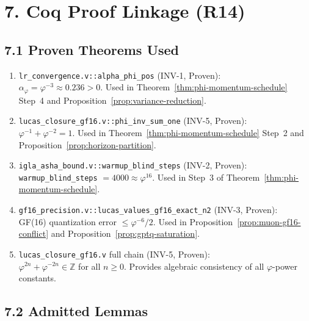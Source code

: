 \section{7. Coq Proof Linkage (R14)}
\label{sec:28-coq}

\subsection{7.1 Proven Theorems Used}

\begin{enumerate}
  \item \texttt{lr\_convergence.v::alpha\_phi\_pos} (INV-1, Proven):\\
        \(\alpha_\varphi = \varphi^{-3} \approx 0.236 > 0\).
        Used in Theorem~\ref{thm:phi-momentum-schedule} Step~4
        and Proposition~\ref{prop:variance-reduction}.

  \item \texttt{lucas\_closure\_gf16.v::phi\_inv\_sum\_one} (INV-5, Proven):\\
        \(\varphi^{-1} + \varphi^{-2} = 1\).
        Used in Theorem~\ref{thm:phi-momentum-schedule} Step~2
        and Proposition~\ref{prop:horizon-partition}.

  \item \texttt{igla\_asha\_bound.v::warmup\_blind\_steps} (INV-2, Proven):\\
        \texttt{warmup\_blind\_steps} $= 4000 \approx \varphi^{16}$.
        Used in Step~3 of Theorem~\ref{thm:phi-momentum-schedule}.

  \item \texttt{gf16\_precision.v::lucas\_values\_gf16\_exact\_n2} (INV-3, Proven):\\
        GF(16) quantization error \(\leq \varphi^{-6}/2\).
        Used in Proposition~\ref{prop:muon-gf16-conflict} and
        Proposition~\ref{prop:gptq-saturation}.

  \item \texttt{lucas\_closure\_gf16.v} full chain (INV-5, Proven):\\
        \(\varphi^{2n} + \varphi^{-2n} \in \mathbb{Z}\) for all \(n \geq 0\).
        Provides algebraic consistency of all \(\varphi\)-power constants.
\end{enumerate}

\subsection{7.2 Admitted Lemmas}

